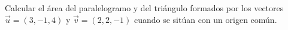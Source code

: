 Calcular el área del paralelogramo y del triángulo formados por los vectores $\vec{u} = (3, -1, 4)$ y $\vec{v} = (2, 2, -1)$ cuando se sitúan con un origen común.